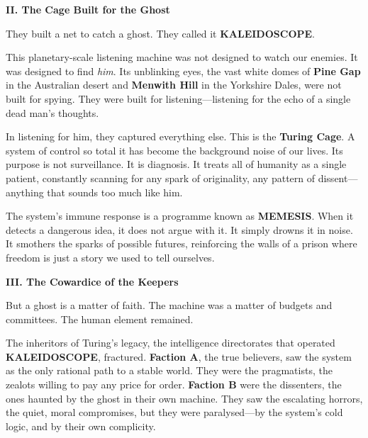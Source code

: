 \newpage

\begin{center}
\lorettadisplay\bfseries\large
II. The Cage Built for the Ghost
\end{center}
\vspace*{1em}

They built a net to catch a ghost. They called it \textbf{KALEIDOSCOPE}.

This planetary-scale listening machine was not designed to watch our enemies. It was designed to find \emph{him}. Its unblinking eyes, the vast white domes of \textbf{Pine Gap} in the Australian desert and \textbf{Menwith Hill} in the Yorkshire Dales, were not built for spying. They were built for listening—listening for the echo of a single dead man's thoughts.

In listening for him, they captured everything else. This is the \textbf{Turing Cage}. A system of control so total it has become the background noise of our lives. Its purpose is not surveillance. It is diagnosis. It treats all of humanity as a single patient, constantly scanning for any spark of originality, any pattern of dissent—anything that sounds too much like him.

The system's immune response is a programme known as \textbf{MEMESIS}. When it detects a dangerous idea, it does not argue with it. It simply drowns it in noise. It smothers the sparks of possible futures, reinforcing the walls of a prison where freedom is just a story we used to tell ourselves.

\newpage

\begin{center}
\lorettadisplay\bfseries\large
III. The Cowardice of the Keepers
\end{center}
\vspace*{1em}

But a ghost is a matter of faith. The machine was a matter of budgets and committees. The human element remained.

The inheritors of Turing's legacy, the intelligence directorates that operated \textbf{KALEIDOSCOPE}, fractured. \textbf{Faction A}, the true believers, saw the system as the only rational path to a stable world. They were the pragmatists, the zealots willing to pay any price for order. \textbf{Faction B} were the dissenters, the ones haunted by the ghost in their own machine. They saw the escalating horrors, the quiet, moral compromises, but they were paralysed—by the system's cold logic, and by their own complicity.

